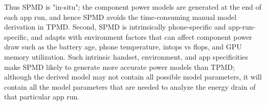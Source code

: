 Thus SPMD is "in-situ"; the component power models are generated 
at the end of each app run, and hence SPMD avoids the time-consuming 
manual model derivation in TPMD.
Second, SPMD is intrinsically phone-specific and app-run-specific, 
and adapts with environment factors that can affect component power 
draw such as the battery age, phone temperature, intops vs flops, and GPU memory utilization.
Such intrinsic handset, environment, and app specificities make SPMD 
likely to generate more accurate power models than TPMD; 
although the derived model may not contain all possible model parameters,
it will contain all the model parameters that are needed to analyze 
the energy drain of that particular app run. 

% 
% 

